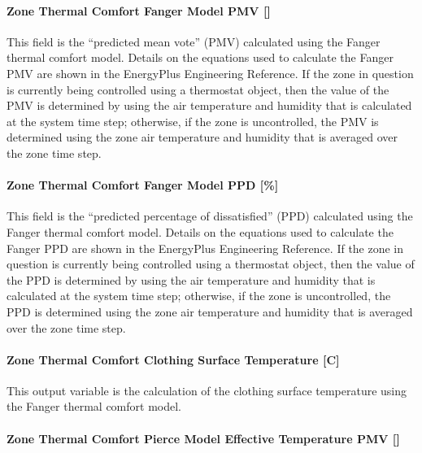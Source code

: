 \paragraph{Zone Thermal Comfort Fanger Model PMV {[]}}\label{zone-thermal-comfort-fanger-model-pmv}

This field is the ``predicted mean vote'' (PMV) calculated using the Fanger thermal comfort model. Details on the equations used to calculate the Fanger PMV are shown in the EnergyPlus Engineering Reference. If the zone in question is currently being controlled using a thermostat object, then the value of the PMV is determined by using the air temperature and humidity that is calculated at the system time step; otherwise, if the zone is uncontrolled, the PMV is determined using the zone air temperature and humidity that is averaged over the zone time step.

\paragraph{Zone Thermal Comfort Fanger Model PPD {[}\%{]}}\label{zone-thermal-comfort-fanger-model-ppd}

This field is the ``predicted percentage of dissatisfied'' (PPD) calculated using the Fanger thermal comfort model.  Details on the equations used to calculate the Fanger PPD are shown in the EnergyPlus Engineering Reference. If the zone in question is currently being controlled using a thermostat object, then the value of the PPD is determined by using the air temperature and humidity that is calculated at the system time step; otherwise, if the zone is uncontrolled, the PPD is determined using the zone air temperature and humidity that is averaged over the zone time step.

\paragraph{Zone Thermal Comfort Clothing Surface Temperature {[}C{]}}\label{zone-thermal-comfort-clothing-surface-temperature-c}

This output variable is the calculation of the clothing surface temperature using the Fanger thermal comfort model.

\paragraph{Zone Thermal Comfort Pierce Model Effective Temperature PMV {[]}}\label{zone-thermal-comfort-pierce-model-effective-temperature-pmv}

